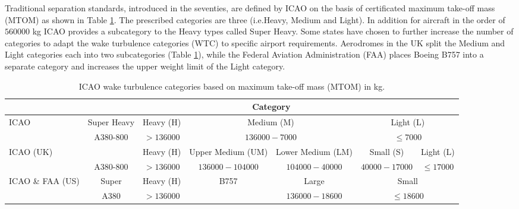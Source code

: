 Traditional separation standards, introduced in the seventies, are defined by ICAO  on the basis of certificated maximum take-off mass (MTOM) as shown in Table \ref{tab:WTC}. The prescribed categories are three (i.e.Heavy, Medium and Light). In addition for aircraft in the order of $560000$ kg ICAO provides a subcategory to the Heavy types called Super Heavy. Some states have chosen to further increase the number of categories to adapt the wake turbulence categories (WTC) to specific airport requirements. Aerodromes in the UK split the Medium and Light categories each into two subcategories (Table \ref{tab:WTC}), while the Federal Aviation Administration (FAA) places Boeing B757 into a separate category and increases the upper weight limit of the Light category. \cite{icao_wtc, uk_aeronautical_information_services_wake_2017, noauthor_recat_2018}

\begin{table}[]
    \centering
    \resizebox{1\textwidth}{!} {
    \begin{tabular}{l|c|c|c|c|c|c}
    ~    & \multicolumn{6}{c}{Category} \\ \hline
    ICAO & Super Heavy & Heavy (H) & \multicolumn{2}{c|}{Medium (M)} & \multicolumn{2}{c}{Light (L)} \\
    
    ~    & A380-800    & $ > 136000 $  & \multicolumn{2}{c|}{$ 136000-7000 $ } & \multicolumn{2}{c}{$ \leq 7000 $} \\ \hline
    
    ICAO (UK)   & ~  & Heavy (H) & Upper Medium (UM) & Lower Medium (LM) & Small (S)  & Light (L) \\
    
    ~    & A380-800    & $ > 136000 $  & $ 136000-104000 $     & $ 104000-40000 $      & $ 40000-17000 $ & $ \leq 17000 $   \\ \hline
    
    ICAO \& FAA (US)   & Super      & Heavy (H) & B757   & Large   & \multicolumn{2}{c}{Small} \\
    
    ~    & A380        & $ > 136000 $  & ~                 & $ 136000-18600 $      & \multicolumn{2}{c}{$ \leq 18600 $} \\ 
    \end{tabular}}
    \caption[ICAO wake turbulence categories based on maximum take-off mass]{ICAO wake turbulence categories based on maximum take-off mass (MTOM) in kg. \cite{icao_wtc, uk_aeronautical_information_services_wake_2017, kolos2013influence}} \label{tab:WTC}
\end{table}

